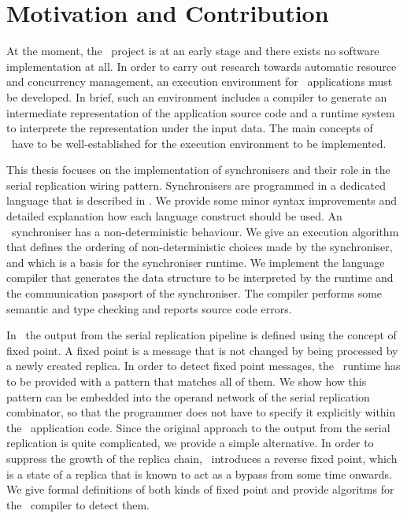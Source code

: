     \section*{Motivation and Contribution}
At the moment, the \ak\ project is at an early stage and there exists no software implementation at all. In order to carry out research towards automatic resource and concurrency management, an execution environment for \ak\ applications must be developed. In brief, such an environment includes a compiler to generate an intermediate representation of the application source code and a runtime system to interprete the representation under the input data. The main concepts of \ak\ have to be well-established for the execution environment to be implemented.

This thesis focuses on the implementation of synchronisers and their role in the serial replication wiring pattern. Synchronisers are programmed in a dedicated language that is described in \cite{astrakahn}. We provide some minor syntax improvements and detailed explanation how each language construct should be used. An \ak\ synchroniser has a non-deterministic behaviour. We give an execution algorithm that defines the ordering of non-deterministic choices made by the synchroniser, and which is a basis for the synchroniser runtime. We implement the language compiler that generates the data structure to be interpreted by the runtime and the communication passport of the synchroniser. The compiler performs some semantic and type checking and reports source code errors.

In \ak\ the output from the serial replication pipeline is defined using the concept of fixed point. A fixed point is a message that is not changed by being processed by a newly created replica. In order to detect fixed point messages, the \ak\ runtime has to be provided with a pattern that matches all of them. We show how this pattern can be embedded into the operand network of the serial replication combinator, so that the programmer does not have to specify it explicitly within the \ak\ application code. Since the original approach to the output from the serial replication is quite complicated, we provide a simple alternative. In order to suppress the growth of the replica chain, \ak\ introduces a reverse fixed point, which is a state of a replica that is known to act as a bypass from some time onwards. We give formal definitions of both kinds of fixed point and provide algoritms for the \ak\ compiler to detect them.



